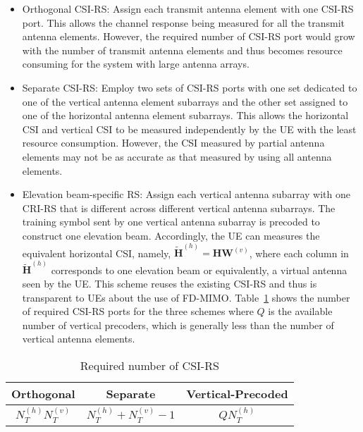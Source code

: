 \documentclass[a4paper,12pt]{article}%
\begin{document}
\begin{itemize}
\item Orthogonal CSI-RS: Assign each transmit antenna element with one CSI-RS port. This allows the channel response being measured for all the transmit antenna elements. However, the required number of CSI-RS port would grow with the number of transmit antenna elements and thus becomes resource consuming for the system with large antenna arrays.
\item Separate CSI-RS: Employ two sets of CSI-RS ports with one set dedicated to one of the vertical antenna element subarrays and the other set assigned to one of the horizontal antenna element subarrays. This allows the horizontal CSI and vertical CSI to be measured independently by the UE with the least resource consumption. However, the CSI measured by partial antenna elements may not be as accurate as that measured by using all antenna elements.
\item Elevation beam-specific RS: Assign each vertical antenna subarray with one CRI-RS that is different across different vertical antenna subarrays. The training symbol sent by one vertical antenna subarray is precoded to construct one elevation beam. Accordingly, the UE can measures the equivalent horizontal CSI, namely, $\tilde{\mathbf{H}}^{(h)} = \mathbf{H} \mathbf{W}^{(v)}$,  where each column in $\tilde{\mathbf{H}}^{(h)}$ corresponds to one elevation beam or equivalently, a virtual antenna seen by the UE. This scheme reuses the existing CSI-RS and thus is transparent to UEs about the use of FD-MIMO. Table~\ref{tab:fd-mimo-csi} shows the number of required CSI-RS ports for the three schemes where $Q$ is the available number of vertical precoders, which is generally less than the number of vertical antenna elements.
\end{itemize}

\begin{table}[ht]
\caption{Required number of CSI-RS} \label{tab:fd-mimo-csi} \centering
  \begin{tabular}{|c|c|c|}
  \hline
Orthogonal & Separate & Vertical-Precoded \\
\hline
$N_T^{(h)} N_T^{(v)}$ & $N_T^{(h)}+N_T^{(v)} - 1$ & $QN_T^{(h)}$ \\
  \hline
  \end{tabular}
\end{table}

\end{document}
